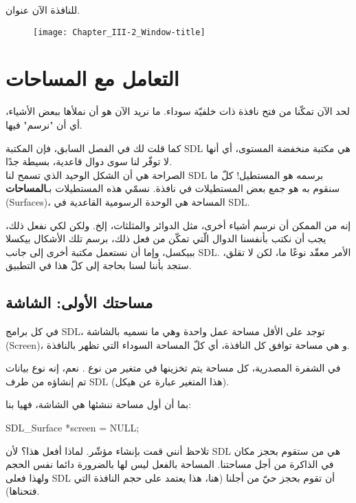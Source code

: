 للنافذة الآن عنوان.

\begin{figure}[H]
	\centering
	\texttt{[image: Chapter\_III-2\_Window-title]}
\end{figure}

\section{التعامل مع المساحات}

لحد الآن تمكّنا من فتح نافذة ذات خلفيّة سوداء. ما نريد الآن هو أن نملأها ببعض الأشياء، أي أن "نرسم" فيها.

كما قلت لك في الفصل السابق، فإن المكتبة
\textenglish{SDL}
هي مكتبة منخفضة المستوى، أي أنها لا توفّر لنا سوى دوال قاعدية، بسيطة جدًا.\\
الصراحة هي أن الشكل الوحيد الذي تسمح لنا \textenglish{SDL}
برسمه هو المستطيل! كلّ ما سنقوم به هو جمع بعض المستطيلات في نافذة. نسمّي هذه المستطيلات بـ\textbf{المساحات}
(\textenglish{Surfaces})،
المساحة هي الوحدة الرسومية القاعدية في \textenglish{SDL}.

\begin{information}
إنه من الممكن أن نرسم أشياء أخرى، مثل الدوائر والمثلثات، إلخ. ولكن لكي نفعل ذلك، يجب أن نكتب بأنفسنا الدوال الّتي تمكّن من فعل ذلك، برسم تلك الأشكال بيكسلا ببيكسل، وإما أن نستعمل مكتبة أخرى إلى جانب \textenglish{SDL}.
الأمر معقّد نوعًا ما، لكن لا تقلق، ستجد بأننا لسنا بحاجة إلى كلّ هذا في التطبيق.
\end{information}

\subsection{مساحتك الأولى: الشاشة}

في كل برامج \textenglish{SDL}،
توجد على الأقل مساحة عمل واحدة وهي ما نسميه بالشاشة 
(\textenglish{Screen})،
و هي مساحة توافق كل النافذة، أي كلّ المساحة السوداء التي تظهر بالنافذة.

في الشفرة المصدرية، كل مساحة يتم تخزينها في متغير من نوع
.
نعم، إنه نوع بيانات تم إنشاؤه من طرف \textenglish{SDL}
(هذا المتغير عبارة عن هيكل).

بما أن أول مساحة ننشئها هي الشاشة، فهيا بنا:

\begin{Csource}
SDL_Surface *screen = NULL;
\end{Csource}

تلاحظ أنني قمت بإنشاء مؤشّر. لماذا أفعل هذا؟ لأن \textenglish{SDL}
هي من ستقوم بحجز مكان في الذاكرة من أجل مساحتنا. المساحة بالفعل ليس لها بالضرورة دائما نفس الحجم ولهذا فعلى \textenglish{SDL}
أن تقوم بحجز حيّ من أجلنا (هنا، هذا يعتمد على حجم النافذة التي فتحناها).

